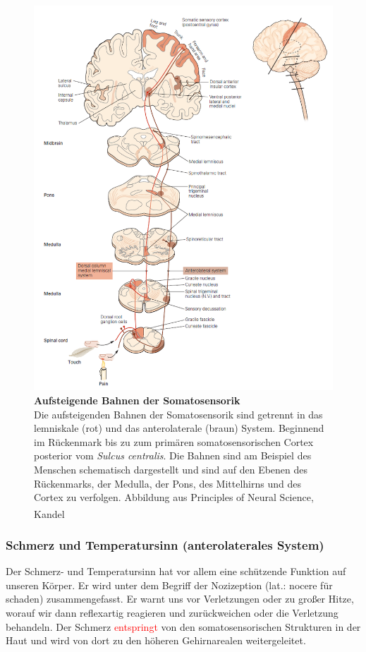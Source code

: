\documentclass[12pt,a4paper,pdftex]{article}
\begin{document}
\begin{figure}[H]
    \centering
    \includegraphics{pictures/somatosensory/pathway_somatosensory2.png}
    \caption[Aufsteigende Bahnen der Somatosensorik]{\textbf{Aufsteigende Bahnen der Somatosensorik}\\
    Die aufsteigenden Bahnen der Somatosensorik sind getrennt in das lemniskale (rot) und das anterolaterale (braun) System. Beginnend im Rückenmark bis zu zum primären somatosensorischen Cortex posterior vom \textit{Sulcus centralis}. Die Bahnen sind am Beispiel des Menschen schematisch dargestellt und sind auf den Ebenen des Rückenmarks, der Medulla, der Pons, des Mittelhirns und des Cortex zu verfolgen.
    Abbildung aus Principles of Neural Science, Kandel \textsuperscript{\cite[22]{kandel2013principles}}}
    \label{fig:somato_pathway}
\end{figure}

\newpage    
\subsubsection{Schmerz und Temperatursinn (anterolaterales System)}
Der Schmerz- und Temperatursinn   hat vor allem eine schützende Funktion auf unseren Körper. Er wird unter dem Begriff der Nozizeption (lat.: nocere für schaden) zusammengefasst. Er warnt uns vor Verletzungen oder zu großer Hitze, worauf wir dann reflexartig reagieren und zurückweichen oder die Verletzung behandeln. Der Schmerz \textcolor{red}{entspringt} von den somatosensorischen Strukturen in der Haut und wird von dort zu den höheren Gehirnarealen weitergeleitet. 
\end{document}
